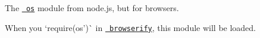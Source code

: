 The \href{https://nodejs.org/api/os.html}{\texttt{ os}} module from node.\+js, but for browsers.

When you `require(\textquotesingle{}os')\`{} in \href{http://github.com/substack/node-browserify}{\texttt{ browserify}}, this module will be loaded. 